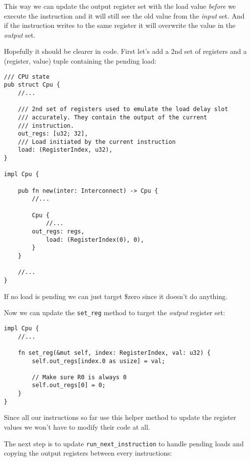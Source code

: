 \documentclass[a4paper]{article}
\newcommand{\code}[1] {\texttt{#1}}
\begin{document}
This way we can update the output register set with the load value
\emph{before} we execute the instruction and it will still see the old
value from the \emph{input} set. And if the instruction writes to the
same register it will overwrite the value in the \emph{output} set.

Hopefully it should be clearer in code. First let's add a 2nd set of
registers and a (register, value) tuple containing the pending load:

\begin{lstlisting}
/// CPU state
pub struct Cpu {
    //...

    /// 2nd set of registers used to emulate the load delay slot
    /// accurately. They contain the output of the current
    /// instruction.
    out_regs: [u32; 32],
    /// Load initiated by the current instruction
    load: (RegisterIndex, u32),
}

impl Cpu {

    pub fn new(inter: Interconnect) -> Cpu {
        //...

        Cpu {
            //...
	    out_regs: regs,
            load: (RegisterIndex(0), 0),
        }
    }

    //...
}
\end{lstlisting}

If no load is pending we can just target \$zero since it doesn't do
anything.

Now we can update the \code{set\_reg} method to target the
\emph{output} register set:

\begin{lstlisting}
impl Cpu {
    //...

    fn set_reg(&mut self, index: RegisterIndex, val: u32) {
        self.out_regs[index.0 as usize] = val;

        // Make sure R0 is always 0
        self.out_regs[0] = 0;
    }
}
\end{lstlisting}

Since all our instructions so far use this helper method to update the
register values we won't have to modify their code at all.

The next step is to update \code{run\_next\_instruction} to handle
pending loads and copying the output registers between every
instructions:
\end{document}
